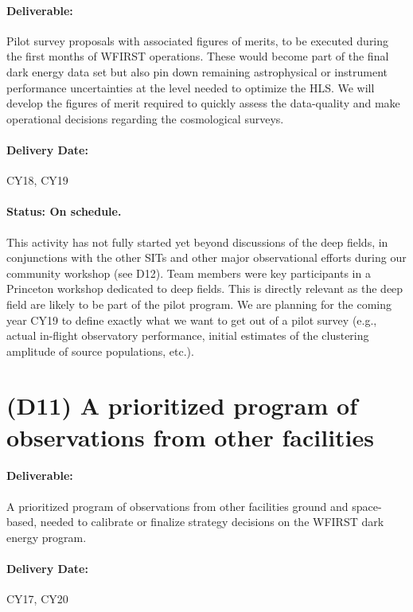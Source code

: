 \paragraph*{Deliverable:} Pilot survey proposals with associated figures of merits, to be executed during the first months of WFIRST operations. These would become
part of the final dark energy data set but also pin down remaining astrophysical
or instrument performance uncertainties at the level needed to optimize the HLS.
We will develop the figures of merit required to quickly assess the data-quality
and make operational decisions regarding the cosmological surveys.

\paragraph*{Delivery Date:} CY18, CY19

\paragraph*{Status: On schedule.} This activity has not fully started yet beyond discussions of the deep fields, in conjunctions with the other SITs and other major observational efforts during our community workshop (see D12). Team members were key participants in a Princeton workshop dedicated to deep fields. This is directly relevant as the deep field are likely to be part of the pilot program. We are planning for the coming year CY19 to define exactly what we want to get out of a pilot survey (e.g., actual in-flight observatory performance, initial estimates of the clustering amplitude of source populations, etc.).

\section*{(D11) A prioritized program of observations from other facilities}

\paragraph*{Deliverable:} A prioritized program of observations from other facilities
ground and space-based, needed to calibrate or finalize strategy decisions on
the WFIRST dark energy program.

\paragraph*{Delivery Date:} CY17, CY20

